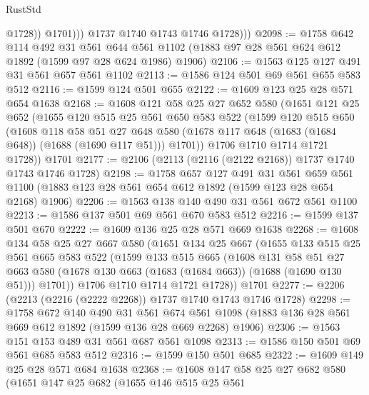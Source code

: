 \begin{lexlean}{RustStd}
\begin{coremodule}
                    @1728))
                @1701)))
          @1737
          @1740
          @1743
          @1746
          @1728)))
@2098 := @1758
    @642
    @114
    @492
    @31
    @561
    @644
    @561
    @1102
    (@1883 @97 @28 @561 @624 @612 @1892 (@1599 @97 @28 @624 @1986) @1906)
@2106 := @1563 @125 @127 @491 @31 @561 @657 @561 @1102
@2113 := @1586 @124 @501 @69 @561 @655 @583 @512
@2116 := @1599 @124 @501 @655
@2122 := @1609 @123 @25 @28 @571 @654 @1638
@2168 := @1608
    @121
    @58
    @25
    @27
    @652
    @580
    (@1651
      @121
      @25
      @652
      (@1655
        @120
        @515
        @25
        @561
        @650
        @583
        @522
        (@1599
          @120
          @515
          @650
          (@1608
            @118
            @58
            @51
            @27
            @648
            @580
            (@1678 @117 @648 (@1683 (@1684 @648)) (@1688 (@1690 @117 @51)))
            @1701))
        @1706
        @1710
        @1714
        @1721
        @1728))
    @1701
@2177 := @2106 (@2113 (@2116 (@2122 @2168)) @1737 @1740 @1743 @1746 @1728)
@2198 := @1758
    @657
    @127
    @491
    @31
    @561
    @659
    @561
    @1100
    (@1883 @123 @28 @561 @654 @612 @1892 (@1599 @123 @28 @654 @2168) @1906)
@2206 := @1563 @138 @140 @490 @31 @561 @672 @561 @1100
@2213 := @1586 @137 @501 @69 @561 @670 @583 @512
@2216 := @1599 @137 @501 @670
@2222 := @1609 @136 @25 @28 @571 @669 @1638
@2268 := @1608
    @134
    @58
    @25
    @27
    @667
    @580
    (@1651
      @134
      @25
      @667
      (@1655
        @133
        @515
        @25
        @561
        @665
        @583
        @522
        (@1599
          @133
          @515
          @665
          (@1608
            @131
            @58
            @51
            @27
            @663
            @580
            (@1678 @130 @663 (@1683 (@1684 @663)) (@1688 (@1690 @130 @51)))
            @1701))
        @1706
        @1710
        @1714
        @1721
        @1728))
    @1701
@2277 := @2206 (@2213 (@2216 (@2222 @2268)) @1737 @1740 @1743 @1746 @1728)
@2298 := @1758
    @672
    @140
    @490
    @31
    @561
    @674
    @561
    @1098
    (@1883 @136 @28 @561 @669 @612 @1892 (@1599 @136 @28 @669 @2268) @1906)
@2306 := @1563 @151 @153 @489 @31 @561 @687 @561 @1098
@2313 := @1586 @150 @501 @69 @561 @685 @583 @512
@2316 := @1599 @150 @501 @685
@2322 := @1609 @149 @25 @28 @571 @684 @1638
@2368 := @1608
    @147
    @58
    @25
    @27
    @682
    @580
    (@1651
      @147
      @25
      @682
      (@1655
        @146
        @515
        @25
        @561

\end{coremodule}
\end{lexlean}
